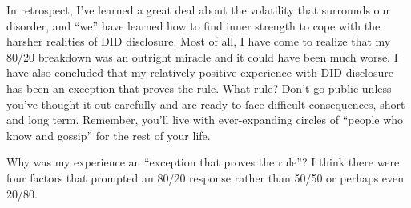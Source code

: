 \documentclass[]{book}
\begin{document}
In retrospect, I've learned a great deal about the volatility that surrounds our disorder, and ``we'' have learned how to find inner strength to cope with the harsher realities of DID disclosure. Most of all, I have come to realize that my 80/20 breakdown was an outright miracle and it could have been much worse. I have also concluded that my relatively-positive experience with DID disclosure has been an exception that proves the rule. What rule? Don't go public unless you've thought it out carefully and are ready to face difficult consequences, short and long term. Remember, you'll live with ever-expanding circles of ``people who know and gossip'' for the rest of your life.

Why was my experience an ``exception that proves the rule''? I think there were four factors that prompted an 80/20 response rather than 50/50 or perhaps even 20/80.
\end{document}
